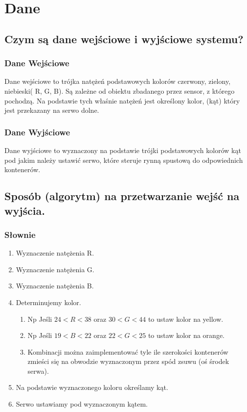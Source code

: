 \documentclass[12pt]{article}
\begin{document}
\section{Dane}
\subsection{Czym są dane wejściowe i wyjściowe systemu?}
\subsubsection{Dane Wejściowe}
Dane wejściowe to trójka natężeń podstawowych kolorów czerwony, zielony, niebieski( R, G, B). Są zależne od obiektu zbadanego przez sensor, z którego pochodzą. Na podstawie tych właśnie natężeń jest określony kolor, (kąt) który jest przekazany na serwo dolne.
\subsubsection{Dane Wyjściowe}
Dane wyjściowe to wyznaczony na podstawie trójki podstawowych kolorów kąt pod jakim należy ustawić serwo, które steruje rynną spustową do odpowiednich kontenerów.
\subsection{Sposób (algorytm) na przetwarzanie wejść na wyjścia.}
\subsubsection{Słownie}
\begin{enumerate}

\item Wyznaczenie natężenia R.
\item Wyznaczenie natężenia G.
\item Wyznaczenie natężenia B.
\item Determinujemy kolor.
\begin{enumerate}
\item Np Jeśli $24 < R < 38$ oraz $30<G<44$ to ustaw kolor na yellow.
\item Np Jeśli $19 < B < 22$ oraz $22<G<25$ to ustaw kolor na orange.
\item Kombinacji można zaimplementować tyle ile szerokości kontenerów zmieści się na obwodzie wyznaczonym przez spód zsuwu (oś środek serwa).
\end{enumerate}
\item Na podstawie wyznaczonego koloru określamy kąt.
\item Serwo ustawiamy pod wyznaczonym kątem.
\end{enumerate}
\end{document}
